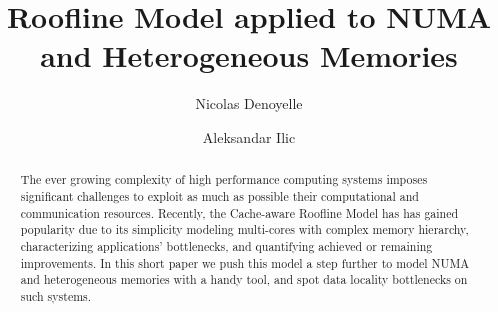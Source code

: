 \documentclass[runningheads,a4paper]{llncs}
\begin{document}
\title{Roofline Model applied to NUMA and Heterogeneous Memories}
\author{Nicolas Denoyelle \and Aleksandar Ilic}

\maketitle

\begin{abstract}

The ever growing complexity of high performance computing systems imposes significant challenges to exploit as much as
possible their computational and communication resources.
Recently, the Cache-aware Roofline Model has has gained popularity due to its simplicity modeling multi-cores with complex memory
hierarchy, characterizing applications' bottlenecks, and quantifying achieved or remaining improvements.
In this short paper we push this model a step further to model NUMA and heterogeneous memories with a handy tool, and spot data
locality bottlenecks on such systems.

\end{abstract}
\end{document}
